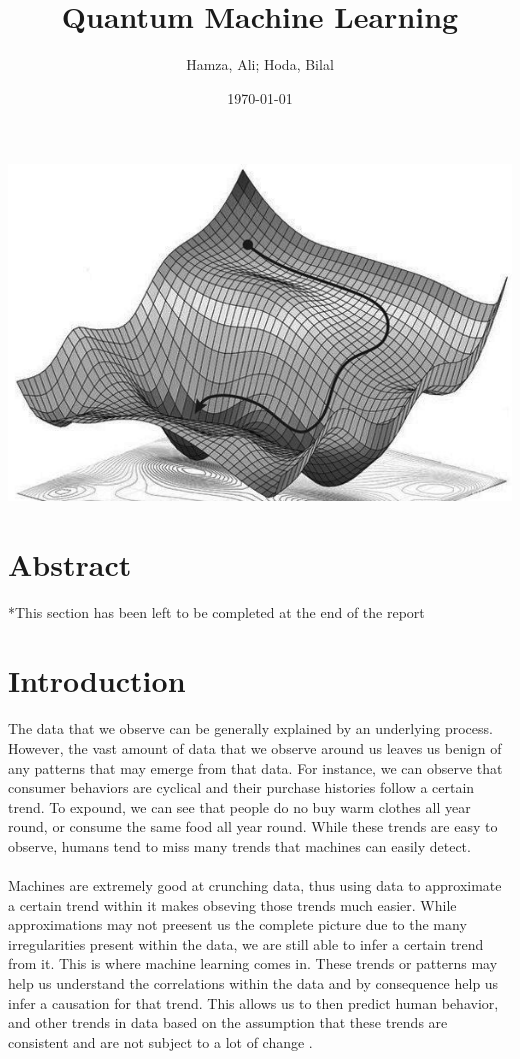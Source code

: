 \documentclass[hidelinks,11pt]{article}
\title{Quantum Machine Learning}
\author{Hamza, Ali; Hoda, Bilal}
\date{\today}
\begin{document}
\maketitle
\begin{center}
		
	\includegraphics[scale = 0.7]{images/title2.jpg}

\end{center}

\newpage

\tableofcontents
\newpage

\section{Abstract}

*This section has been left to be completed at the end of the report
\newpage
\section{Introduction}

The data that we observe can be generally explained by an underlying process.
However, the vast amount of data that we observe around us leaves us benign of any patterns that may emerge from that data. For instance, we can observe that consumer behaviors are cyclical and their purchase histories follow a certain trend. To expound, we can see that people do no buy warm clothes all year round, or consume the same food all year round. While these trends are easy to observe, humans tend to miss many trends that machines can easily detect. 
\paragraph{}
Machines are extremely good at crunching data, thus using data to approximate a certain trend within it makes obseving those trends much easier. While approximations may not preesent us the complete picture due to the many irregularities present within the data, we are still able to infer a certain trend from it. This is where machine learning comes in. These trends or patterns may help us understand the correlations within the data and by consequence help us infer a causation for that trend. This allows us to then predict human behavior, and other trends in data based on the assumption that these trends are consistent and are not subject to a lot of change \cite{BOOK:3}.
\end{document}
